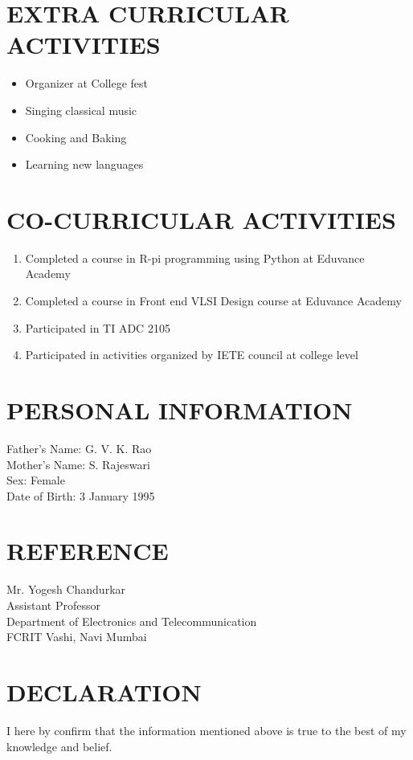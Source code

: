 \documentclass[line, margin]{res}
\begin{document}
\begin{resume}
\section{\bf EXTRA CURRICULAR ACTIVITIES}
\begin{itemize}
	\item Organizer at College fest  
	\item Singing classical music
	\item Cooking and Baking
	\item Learning new languages
\end{itemize}

\section{\bf CO-CURRICULAR ACTIVITIES}
\begin{enumerate}
	\item Completed a course in R-pi programming using Python at Eduvance Academy
	\item Completed a course in Front end VLSI Design course at Eduvance Academy
	\item Participated in TI ADC 2105
	\item Participated in activities organized by IETE council at college level
\end{enumerate}

\section{\bf PERSONAL INFORMATION}
Father's Name: G. V. K. Rao \\
Mother's Name: S. Rajeswari \\
Sex: Female \\
Date  of Birth: 3 January 1995 \\

\section{\bf REFERENCE}
Mr. Yogesh Chandurkar \\
Assistant Professor \\
Department of Electronics and Telecommunication \\
FCRIT Vashi, Navi Mumbai \\

\section{\bf DECLARATION}
I here by confirm that the information mentioned above is true to the best of my knowledge and belief.


\end{resume}
\end{document}
